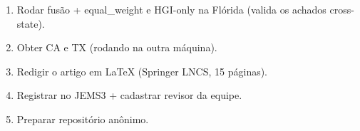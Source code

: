 \documentclass[12pt,a4paper]{article}
\begin{document}
\begin{enumerate}[noitemsep]
\item Rodar fusão + equal\_weight e HGI-only na Flórida (valida os achados cross-state).
\item Obter CA e TX (rodando na outra máquina).
\item Redigir o artigo em LaTeX (Springer LNCS, 15 páginas).
\item Registrar no JEMS3 + cadastrar revisor da equipe.
\item Preparar repositório anônimo.
\end{enumerate}
\end{document}
